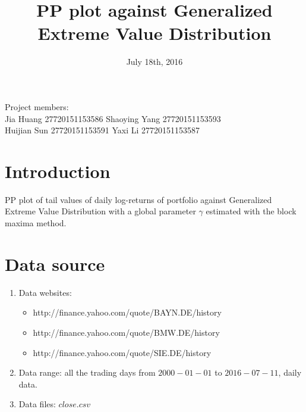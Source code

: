 \documentclass[a4paper,11pt]{article}
\begin{document}
\title{\Large{PP plot against Generalized Extreme Value Distribution}}
\date{July 18th, 2016}
\maketitle
\begin{flushleft}

Project members:\\

\hspace{1.5cm} Jia Huang 27720151153586\hspace{1.5cm}    Shaoying Yang 27720151153593\\
 \hspace{1.5cm} Huijian Sun 27720151153591 \hspace{1.05cm}   Yaxi Li 27720151153587\\



\section{Introduction}

PP plot of tail values of daily log-returns of portfolio against Generalized Extreme Value Distribution with a global parameter $\gamma$ estimated with the block maxima method.\\

\section{Data source}

\begin{enumerate}
\item Data websites: \begin{itemize}
\item	http://finance.yahoo.com/quote/BAYN.DE/history\\
\item    http://finance.yahoo.com/quote/BMW.DE/history\\
\item   http://finance.yahoo.com/quote/SIE.DE/history\\
\end{itemize}
\item Data range: all the trading days from $2000-01-01$ to $2016-07-11$, daily data.\\

\item Data files: $close.csv$\\


\end{enumerate}
\end{flushleft}
\end{document}

